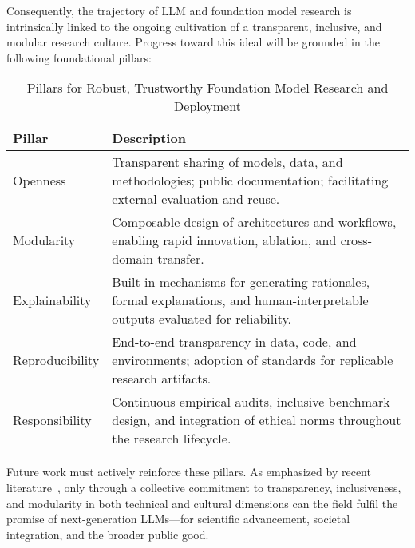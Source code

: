 \documentclass[sigconf]{acmart}
\begin{document}
Consequently, the trajectory of LLM and foundation model research is intrinsically linked to the ongoing cultivation of a transparent, inclusive, and modular research culture. Progress toward this ideal will be grounded in the following foundational pillars:

\begin{table*}[htbp]
\centering
\caption{Pillars for Robust, Trustworthy Foundation Model Research and Deployment}
\label{tab:pillars_future}
\begin{adjustbox}{max width=\textwidth}
\begin{tabular}{ll}
\toprule
\textbf{Pillar} & \textbf{Description} \\
\midrule
Openness        & Transparent sharing of models, data, and methodologies; public documentation; facilitating external evaluation and reuse. \\
Modularity      & Composable design of architectures and workflows, enabling rapid innovation, ablation, and cross-domain transfer. \\
Explainability  & Built-in mechanisms for generating rationales, formal explanations, and human-interpretable outputs evaluated for reliability. \\
Reproducibility & End-to-end transparency in data, code, and environments; adoption of standards for replicable research artifacts. \\
Responsibility  & Continuous empirical audits, inclusive benchmark design, and integration of ethical norms throughout the research lifecycle. \\
\bottomrule
\end{tabular}
\end{adjustbox}
\end{table*}

Future work must actively reinforce these pillars. As emphasized by recent literature~\cite{ref91,ref92,ref93,ref94,ref95,ref96,ref97,ref98,ref99,ref100,ref101,ref102,ref103,ref104,ref105,ref106,ref107,ref108}, only through a collective commitment to transparency, inclusiveness, and modularity in both technical and cultural dimensions can the field fulfil the promise of next-generation LLMs—for scientific advancement, societal integration, and the broader public good.



\end{document}
